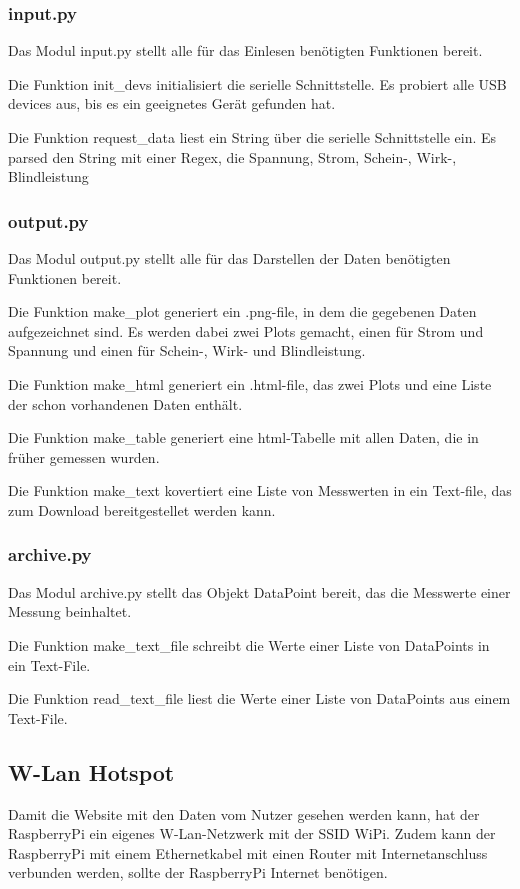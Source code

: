 \documentclass{article}
\begin{document}
\subsubsection{input.py}
Das Modul input.py stellt alle für das Einlesen benötigten Funktionen bereit.

Die Funktion init\_devs initialisiert die serielle Schnittstelle.
Es probiert alle USB devices aus, bis es ein geeignetes Gerät gefunden hat.

Die Funktion request\_data liest ein String über die serielle Schnittstelle ein.
Es parsed den String mit einer Regex, die Spannung, Strom, Schein-, Wirk-, Blindleistung 

\subsubsection{output.py}
Das Modul output.py stellt alle für das Darstellen der Daten benötigten Funktionen bereit.

Die Funktion make\_plot generiert ein .png-file, in dem die gegebenen Daten aufgezeichnet sind.
Es werden dabei zwei Plots gemacht, einen für Strom und Spannung und einen für Schein-, Wirk- und Blindleistung.

Die Funktion make\_html generiert ein .html-file, das zwei Plots und eine Liste der schon vorhandenen Daten enthält.

Die Funktion make\_table generiert eine html-Tabelle mit allen Daten, die in früher gemessen wurden.

Die Funktion make\_text kovertiert eine Liste von Messwerten in ein Text-file, das zum Download bereitgestellet werden kann.

\subsubsection{archive.py}
Das Modul archive.py stellt das Objekt DataPoint bereit, das die Messwerte einer Messung beinhaltet.

Die Funktion make\_text\_file schreibt die Werte einer Liste von DataPoints in ein Text-File.

Die Funktion read\_text\_file liest die Werte einer Liste von DataPoints aus einem Text-File.

\subsection{W-Lan Hotspot}
Damit die Website mit den Daten vom Nutzer gesehen werden kann, hat der RaspberryPi ein eigenes W-Lan-Netzwerk mit der SSID WiPi.
Zudem kann der RaspberryPi mit einem Ethernetkabel mit einen Router mit Internetanschluss verbunden werden, sollte der RaspberryPi Internet benötigen.
\end{document}
